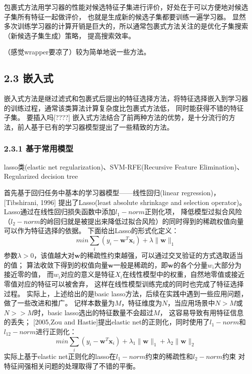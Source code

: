 \documentclass[a4paper,UTF8]{article}
\begin{document}
包裹式方法用学习器的性能对候选特征子集进行评价，好处在于可以方便地对候选子集所有特征一起做评价，
也就是生成新的候选子集都要训练一遍学习器。
显然多次训练学习器的计算开销是巨大的，所以通常包裹式方法关注的是优化子集搜索（新候选子集生成）策略，
提高搜索效率。

（感觉wrapper要凉了）较为简单地说一些方法。


\subsection*{2.3 嵌入式}

嵌入式方法是继过滤式和包裹式后提出的特征选择方法，将特征选择嵌入到学习器的训练过程，通常该类算法计算复杂度比包裹式方法低，
同时能获得不错的特征子集。
要插入吗[????]
嵌入式方法结合了前两种方法的优势，是十分流行的方法，前人基于已有的学习器模型提出了一些精致的方法。

\subsubsection*{2.3.1 基于常用模型}

lasso类(elastic net regularization)、SVM-RFE(Recursive Feature Elimination)、Regularized decision tree

首先基于回归任务中基本的学习器模型——线性回归(linear regression)，[Tibshirani, 1996]
提出了Lasso(least absolute shrinkage and selection operator)。
Lasso通过在线性回归损失函数中添加$l_{1}-norm$正则化项，
降低模型过拟合风险（$l_{2}-norm$的岭回归就是被提出来降低过拟合风险）的同时得到的稀疏权值向量可以作为特征选择的依据。
下面给出Lasso的形式化定义：
$$ min \sum_{i}(y_{i}-\textbf{w}^{T}\textbf{x}_{i})+\lambda \parallel \textbf{w} \parallel _{1} $$
参数$\lambda>0$，该值越大对$\textbf{w}$的稀疏性约束越强，可以通过交叉验证的方式选取适当的值；
算法收敛下得到的权值向量$\textbf{w}$一般是稀疏的，即$\textbf{w}$的各个分量$w_{i}$大部分为接近零的值，
而$w_{i}$对应的意义是特征$X_{i}$在线性模型中的权重，自然地零值或接近零值对应的特征可以被舍弃，
这样在线性模型训练完成的同时也完成了特征选择过程。
实际上，上述给出的是basic lasso方法，后续在实践中遇到一些应用问题，做了一些改进和推广。
记样本数量为$M$，特征维度为$N$，当应用场景中$N>M$或$N>>M$时，basic lasso选出的特征数量不会超过$M$，
这容易导致有用特征信息的丢失；
[2005,Zou and Hastie]提出elastic net的正则化，同时使用了$l_{1}-norm$和$l_{12}-norm$进行正则化：
$$ min \sum_{i}(y_{i}-\textbf{w}^{T}\textbf{x}_{i})+
\lambda_{1} \parallel \textbf{w} \parallel _{1} +\lambda_{2} \parallel \textbf{w} \parallel _{2} $$
实际上基于elastic net正则化的lasso在$l_{1}-norm$约束的稀疏性和$l_{2}-norm$约束
对特征间强相关问题的处理取得了不错的平衡。
\end{document}

